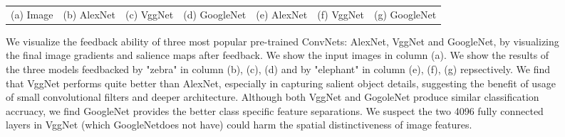 \begin{figure}
\begin{center}
\begin{tabular}{ccccccc}
{\small (a) Image} &
{\small (b) AlexNet} &
{\small (c) VggNet} &
{\small (d) GoogleNet} &
{\small (e) AlexNet} &
{\small (f) VggNet} &
{\small (g) GoogleNet} \\
\end{tabular}
\caption{We visualize the feedback ability of three most popular pre-trained ConvNets: AlexNet, VggNet and GoogleNet, by visualizing the final image gradients and salience maps after feedback. We show the input images in column (a). We show the results of the three models feedbacked by "zebra" in column (b), (c), (d) and by "elephant" in column (e), (f), (g) repsectively. We find that VggNet performs quite better than AlexNet, especially in capturing salient object details, suggesting the benefit of usage of small convolutional filters and deeper architecture. Although both VggNet and GogoleNet produce similar classification accruacy, we find GoogleNet provides the better class specific feature separations. We suspect the two 4096 fully connected layers in VggNet (which GoogleNetdoes not have) could harm the spatial distinctiveness of image features.}
\label{fig:model_compare}
\end{center}
\end{figure}

